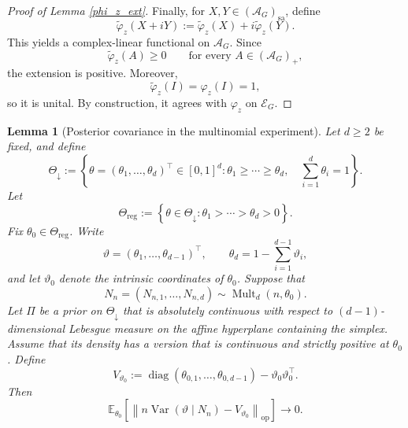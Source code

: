 \documentclass{article}
\newtheorem{lemma}[theorem]{Lemma}
\theoremstyle{named}
\theoremstyle{named1}
\theoremstyle{plain}
\theoremstyle{remark}
\begin{document}
\begin{proof}[Proof of Lemma \ref{phi_z_ext}]
Finally, for $X,Y\in(\mathcal{A}_G)_{\mathrm{sa}}$, define
\[
\widetilde{\varphi}_z(X+iY)
:=
\widetilde{\varphi}_z(X)
+i\widetilde{\varphi}_z(Y).
\]
This yields a complex-linear functional on $\mathcal{A}_G$. Since
\[
\widetilde{\varphi}_z(A)\geq 0
\qquad
\text{for every } A\in(\mathcal{A}_G)_+,
\]
the extension is positive. Moreover,
\[
\widetilde{\varphi}_z(I)
=
\varphi_z(I)
=
1,
\]
so it is unital. By construction, it agrees with $\varphi_z$ on
$\mathcal{E}_G$.
\end{proof}


\begin{lemma}[Posterior covariance in the multinomial experiment]
\label{lem:multinomial-posterior-covariance}
Let $d\geq2$ be fixed, and define
\[
    \Theta_{\downarrow}
    :=
    \left\{
        \theta=(\theta_1,\ldots,\theta_d)^\top\in[0,1]^d:
        \theta_1\geq\cdots\geq\theta_d,\quad
        \sum_{i=1}^d\theta_i=1
    \right\}.
\]
Let
\[
    \Theta_{\mathrm{reg}}
    :=
    \left\{
        \theta\in\Theta_{\downarrow}:
        \theta_1>\cdots>\theta_d>0
    \right\}.
\]
Fix $\theta_0\in\Theta_{\mathrm{reg}}$. Write
\[
    \vartheta=(\theta_1,\ldots,\theta_{d-1})^\top,
    \qquad
    \theta_d=1-\sum_{i=1}^{d-1}\vartheta_i,
\]
and let $\vartheta_0$ denote the intrinsic coordinates of $\theta_0$.
Suppose that
\[
    N_n=(N_{n,1},\ldots,N_{n,d})
    \sim\operatorname{Mult}_d(n,\theta_0).
\]
Let $\Pi$ be a prior on $\Theta_{\downarrow}$ that is absolutely
continuous with respect to $(d-1)$-dimensional Lebesgue measure on the
affine hyperplane containing the simplex. Assume that its density has a
version that is continuous and strictly positive at $\theta_0$.
Define
\[
    V_{\vartheta_0}
    :=
    \operatorname{diag}(\theta_{0,1},\ldots,\theta_{0,d-1})
    -\vartheta_0\vartheta_0^\top.
\]
Then
\[
    \mathbb E_{\theta_0}
    \left[
        \left\|
            n\operatorname{Var}(\vartheta\mid N_n)
            -V_{\vartheta_0}
        \right\|_{\mathrm{op}}
    \right]
    \rightarrow0.
\]
\end{lemma}
\end{document}
